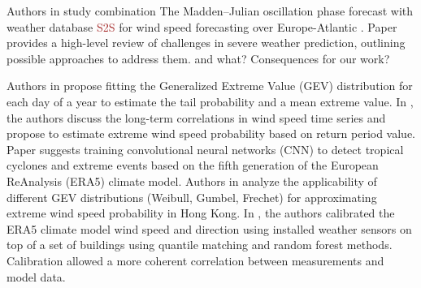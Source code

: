 \documentclass{article}
\begin{document}
Authors in \cite{lledo2020predicting} study combination The Madden–Julian oscillation phase forecast with weather database \textcolor{brown}{S2S} for wind speed forecasting over Europe-Atlantic \cite{vitart2017subseasonal}. 
Paper \cite{SILLMANN201765} provides a high-level review of challenges in severe weather prediction, outlining possible approaches to address them. {\color{brown} and what? Consequences for our work?}

Authors in \cite{shang2021functional} propose fitting the Generalized Extreme Value (GEV) distribution for each day of a year to estimate the tail probability and a mean extreme value.
In \cite{liu2019long}, the authors discuss the long-term correlations in wind speed time series and propose to estimate extreme wind speed probability based on return period value. Paper \cite{liu2016application} suggests training convolutional neural networks (CNN) to detect tropical cyclones and extreme events based on the fifth generation of the European ReAnalysis (ERA5) climate model. Authors in \cite{xiao2006probability} analyze the applicability of different GEV distributions (Weibull, Gumbel, Frechet) for approximating extreme wind speed probability in Hong Kong. 
In \cite{gonzalez2020calibration}, the authors calibrated the ERA5 climate model wind speed and direction using installed weather sensors on top of a set of buildings using quantile matching and random forest methods. Calibration allowed a more coherent correlation between measurements and model data. 
\end{document}
